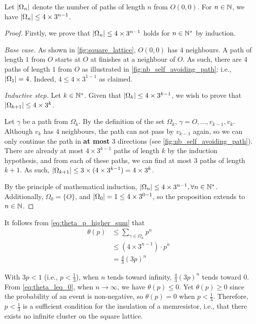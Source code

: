 \documentclass[a4paper, 12pt]{article}
\begin{document}
\begin{prop}\label{prop:omega_size}
    Let $\lvert \Omega_n \rvert$ denote the number of paths of length $n$ from $O(0, 0)$. For $n \in \mathbb{N}$, we have $\lvert \Omega_n \rvert \leq 4 \times 3^{n - 1}$.
\end{prop}
\begin{proof}
    Firstly, we prove that $\lvert \Omega_n \rvert \leq 4 \times 3^{n - 1}$ holds for $n \in \mathbb{N}^*$ by induction.
    
    \begin{description}
        \item \textit{Base case. }
As shown in \cref{fig:square_lattice}, $O(0, 0)$ has $4$ neighbours. A path of length $1$ from $O$ starts at $O$ at finishes at a neighbour of $O$. As such, there are $4$ paths of length $1$ from $O$ as illustrated in \cref{fig:nb_self_avoiding_path}; i.e., $\lvert \Omega_1 \rvert = 4$. Indeed, $4 \leq 4 \times 3^{1 - 1}$ as claimed.
        \item \textit{Inductive step. }
Let $k \in \mathbb{N}^*$. Given that $\lvert \Omega_k \rvert \leq 4 \times 3^{k - 1}$, we wish to prove that $\lvert \Omega_{k + 1} \rvert \leq 4 \times 3^k$.

Let $\gamma$ be a path from $\Omega_k$. By the definition of the set $\Omega_k$, $\gamma = O, \dots, v_{k - 1}, v_k$. Although $v_k$ has $4$ neighbours, the path can not pass by $v_{k - 1}$ again, so we can only continue the path in \textbf{at most} $3$ directions (see \cref{fig:nb_self_avoiding_path}). There are already at most $4 \times 3^{k - 1}$ paths of length $k$ by the induction hypothesis, and from each of these paths, we can find at most $3$ paths of length $k + 1$. As such, $\lvert \Omega_{k + 1} \rvert \leq 3 \times (4 \times 3^{k - 1}) = 4 \times 3^{k}$.
\end{description}
By the principle of mathematical induction, $\lvert \Omega_n \rvert \leq 4 \times 3^{n - 1}, \forall n \in \mathbb{N}^*$. Additionally, $\Omega_0 = \{O\}$, and $\lvert \Omega_0 \rvert = 1 \leq 4 \times 3^{0 - 1}$, so the proposition extends to $n \in \mathbb{N}$.
\end{proof}

It follows from \cref{eq:theta_p_higher_sum} that
\begin{align}\label{eq:theta_leq_0}
    \theta(p) &\leq \sum_{\gamma \in \Omega_n} p^n\nonumber\\
    &\leq (4 \times 3^{n - 1}) \cdot p^n\nonumber\\
    &= \frac{4}{3} (3p)^n
\end{align}

With $3p < 1$ (i.e., $p < \frac{1}{3}$), when $n$ tends toward infinity, $\frac{4}{3}(3p)^n$ tends toward $0$. From \cref{eq:theta_leq_0}, when $n \to \infty$, we have $\theta(p) \leq 0$. Yet $\theta(p) \geq 0$ since the probability of an event is non-negative, so $\theta(p) = 0$ when $p < \frac{1}{3}$. Therefore, $p < \frac{1}{3}$ is a sufficient condition for the insulation of a memresistor, i.e., that there exists no infinite cluster on the square lattice.
\end{document}
